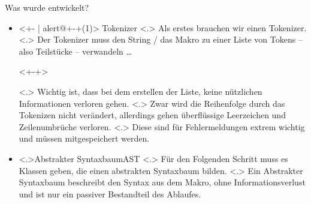   \begin{frame}{Was wurde entwickelt?}
    \vspace*{1em}%
    \begin{itemize}[<+- | alert@+>]
      \item<+- | alert@+-+(1)>
        Tokenizer
            \note[item]<.>{
              Als erstes brauchen wir einen Tokenizer.
            }
            \note[item]<.>{
              Der Tokenizer muss den String / das Makro zu einer Liste von Tokens -- also Teilstücke -- verwandeln \ldots
            }
        \begin{uncoverenv}<+-+>%
        \end{uncoverenv}%
            \note[item]<.>{
              Wichtig ist, dass bei dem erstellen der Liste, keine nützlichen Informationen verloren gehen.
            }
            \note[item]<.>{
              Zwar wird die Reihenfolge durch das Tokenizen nicht verändert, allerdings gehen überflüssige Leerzeichen und Zeilenumbrüche verloren.
            }
            \note[item]<.>{
              Diese sind für Fehlermeldungen extrem wichtig und müssen mitgespeichert werden.
            }
      \item
        \temporal<.>{}{Abstrakter Syntaxbaum}{AST}
            \note[item]<.>{
              Für den Folgenden Schritt muss es Klassen geben, die einen abstrakten Syntaxbaum bilden.
            }
            \note[item]<.>{
              Ein Abstrakter Syntaxbaum beschreibt den Syntax aus dem Makro, ohne Informationsverlust und ist nur ein passiver Bestandteil des Ablaufes.
}
\end{itemize}
\end{frame}
